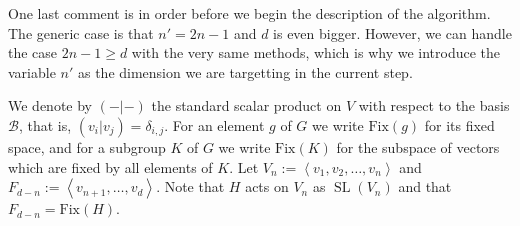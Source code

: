 \documentclass[a4paper,11pt]{article}
\def\SL{\operatorname{SL}}
\newcommand{\Fix}[1]{\mathrm{Fix}(#1)}
\newcommand{\B}{\mathcal{B}}
\begin{document}
One last comment is in order before we begin the description of the
algorithm. The generic case is that $n'=2n-1$ and $d$ is even bigger.
However, we can handle the case $2n-1 \ge d$ with the very same
methods, which is why we introduce the variable $n'$ as the dimension
we are targetting in the current step.

We denote by $(-|-)$
the standard scalar product on $V$ with respect to the basis $\B$,
that is, $(v_i|v_j) = \delta_{i,j}$.
For an element $g$ of $G$ we write
$\Fix g$ for its fixed space, and for a subgroup $K$ of $G$ we write
$\Fix K$ for the subspace of vectors which are fixed by all elements
of $K$.
Let $V_n := \left< v_1, v_2, \ldots, v_n\right>$ and $F_{d-n} :=
\left< v_{n+1}, \ldots, v_d \right>$. Note that $H$ acts on $V_n$ as
$\SL(V_n)$ and that $F_{d-n} = \Fix H$.
\end{document}
